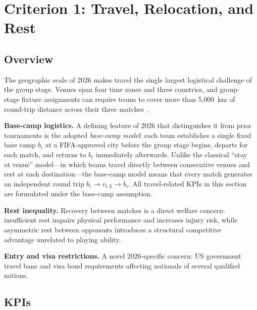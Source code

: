 \documentclass[12pt, letterpaper]{article}
\begin{document}
\section{Criterion 1: Travel, Relocation, and Rest}

\subsection{Overview}

The geographic scale of 2026 makes travel the single largest logistical
challenge of the group stage.  Venues span four time zones and three
countries, and group-stage fixture assignments can require teams to cover
more than 5{,}000~km of round-trip distance across their three
matches~\citep{SITravel2026}.

\medskip
\textbf{Base-camp logistics.}
A defining feature of 2026 that distinguishes it from prior tournaments
is the adopted \emph{base-camp model}: each team establishes a single
fixed base camp $b_i$ at a FIFA-approved city before the group stage
begins, departs for each match, and returns to $b_i$ immediately
afterwards.  Unlike the classical ``stay at venue'' model---in which
teams travel directly between consecutive venues and rest at each
destination---the base-camp model means that every match generates an
independent round trip $b_i \!\to\! v_{i,k} \!\to\! b_i$.
All travel-related KPIs in this section are formulated under the
base-camp assumption.

\medskip
\textbf{Rest inequality.}
Recovery between matches is a direct welfare concern: insufficient rest
impairs physical performance and increases injury risk, while asymmetric
rest between opponents introduces a structural competitive advantage
unrelated to playing ability.

\medskip
\textbf{Entry and visa restrictions.}
A novel 2026-specific concern: US government travel bans and visa bond
requirements affecting nationals of several qualified nations.

\subsection{KPIs}
\end{document}
